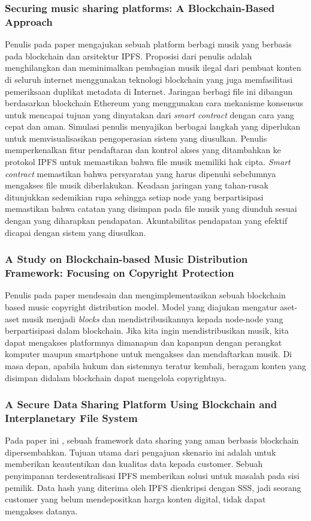 \subsubsection{Securing music sharing platforms: A Blockchain-Based Approach}
Penulis pada paper \citep{adjei2021securing} mengajukan sebuah platform berbagi musik yang berbasis pada blockchain dan arsitektur IPFS. 
Proposisi dari penulis adalah menghilangkan dan meminimalkan pembagian musik ilegal dari pembuat konten di seluruh
internet menggunakan teknologi blockchain yang juga memfasilitasi pemeriksaan duplikat metadata di
Internet. Jaringan berbagi file ini dibangun berdasarkan blockchain Ethereum yang menggunakan
cara mekanisme konsensus untuk mencapai tujuan yang dinyatakan dari \emph{smart contract} dengan cara yang cepat dan aman.
Simulasi penulis menyajikan berbagai langkah yang diperlukan untuk memvisualisasikan pengoperasian sistem yang diusulkan. Penulis memperkenalkan fitur pendaftaran dan kontrol akses yang ditambahkan ke protokol IPFS untuk memastikan bahwa
file musik memiliki hak cipta. \emph{Smart contract} memastikan bahwa persyaratan yang harus dipenuhi sebelumnya
mengakses file musik diberlakukan. Keadaan jaringan yang tahan-rusak ditunjukkan sedemikian rupa sehingga
setiap node yang berpartisipasi memastikan bahwa catatan yang disimpan pada file musik yang diunduh sesuai dengan yang diharapkan
pendapatan. Akuntabilitas pendapatan yang efektif dicapai dengan sistem yang diusulkan.

\subsubsection{A Study on Blockchain-based Music Distribution Framework: Focusing on Copyright Protection}

Penulis pada paper \citep{kim2020study} mendesain dan mengimplementasikan sebuah blockchain based music copyright distribution model.
Model yang diajukan mengatur aset-aset musik menjadi \emph{blocks} dan mendistribusikannya kepada node-node yang berpartisipasi dalam blockchain.
Jika kita ingin mendistribusikan musik, kita dapat mengakses platformnya dimanapun dan kapanpun dengan perangkat komputer maupun smartphone untuk mengakses dan
mendaftarkan musik. Di masa depan, apabila hukum dan sistemnya teratur kembali, beragam konten yang disimpan didalam blockchain dapat mengelola copyrightnya.

\subsubsection{A Secure Data Sharing Platform Using Blockchain and Interplanetary File System}
Pada paper ini \citep{naz2019secure}, sebuah framework data sharing yang aman berbasis blockchain dipersembahkan. Tujuan utama dari pengajuan skenario ini adalah untuk 
memberikan keautentikan dan kualitas data kepada customer. Sebuah penyimpanan terdesentralisasi IPFS memberikan solusi untuk masalah pada sisi pemilik.
Data hash yang diterima oleh IPFS dienkripsi dengan SSS, jadi seorang customer yang belum mendepositkan harga konten digital, tidak dapat mengakses datanya.

